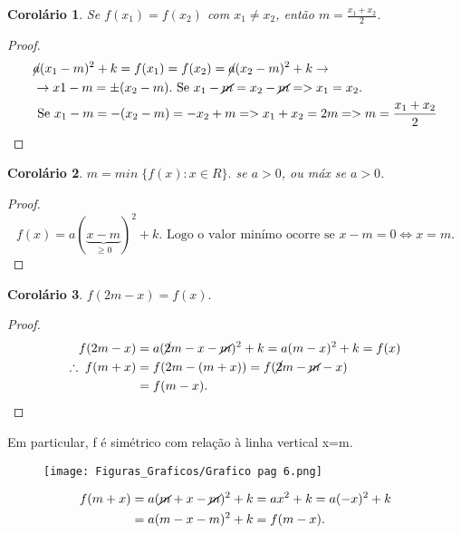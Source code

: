 \documentclass{article}
\newtheorem*{corollary}{Corolário}
\begin{document}
\begin{corollary}
Se $f(x_1) = f(x_2)$ com $x_1 \neq x_2$, então $m = \frac{x_1 + x_2}{2}$.
\end{corollary}

\begin{proof}
\begin{align*}
   &\cancel{a}(x_1-m)^2 + k = f(x_1) = f(x_2) = \cancel{a}(x_2-m)^2 + k \rightarrow \\
   &\rightarrow x1-m = \pm (x_2-m). \text{ Se } x_1-\cancel{m} = x_2-\cancel{m} => x_1 = x_2. \\
   &\text{ Se } x_1-m = -(x_2-m) = -x_2+m => x_1+x_2 = 2m => m=\frac{x_1+x_2}{2}
\end{align*}
\end{proof}

\pagebreak
\begin{corollary}
$m = min\;\{f(x): x\in R\}. $ se $a>0$, ou máx se $a>0$.
\end{corollary}


\begin{proof}
\[f(x) = a(\underbrace{x-m}_{\geq 0})^2 + k.\text{ Logo o valor minímo ocorre se } x-m = 0 \Longleftrightarrow x=m. \]
\end{proof}


\begin{corollary}
    $f(2m-x) = f(x).$
\end{corollary}

\begin{proof}
\begin{align*}
    f(2m-x) &= a(\cancel{2}m-x-\cancel{m})^2 + k = a(m-x)^2+k = f(x) \\
    \therefore \; f(m+x) &= f(2m - (m+x)) = f(\cancel{2}m-\cancel{m}-x) \\
    &=f(m-x).
\end{align*}
\end{proof}


Em particular, f é simétrico com relação à linha vertical x=m.

\begin{figure}[H]
    \centering
    \texttt{[image: Figuras\_Graficos/Grafico pag 6.png]}
    \label{Grafico pag6}
\end{figure}

\begin{align*}
    f(m+x) &= a(\cancel{m}+x-\cancel{m})^2 + k = ax^2+k = a(-x)^2+k \\
    &=a(m-x-m)^2 + k = f(m-x).
\end{align*}
\end{document}
